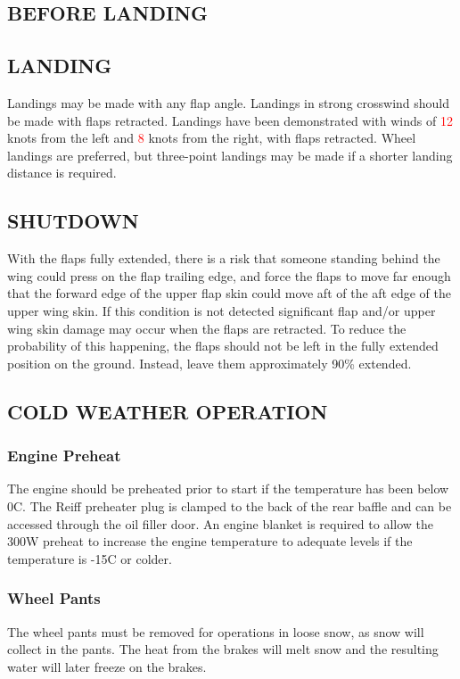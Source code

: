 \subsection{BEFORE LANDING}

\subsection{LANDING}
Landings may be made with any flap angle. Landings in strong crosswind should be made with flaps retracted. Landings have been demonstrated with winds of \textcolor{red}{12} knots from the left and \textcolor{red}{8} knots from the right, with flaps retracted. Wheel landings are preferred, but three-point landings may be made if a shorter landing distance is required.

\subsection{SHUTDOWN}
\begin{Note}[CAUTION]
With the flaps fully extended, there is a risk that someone standing behind the wing could press on the flap trailing edge, and force the flaps to move far enough that the forward edge of the upper flap skin could move aft of the aft edge of the upper wing skin. If this condition is not detected significant flap and/or upper wing skin damage may occur when the flaps are retracted. To reduce the probability of this happening, the flaps should not be left in the fully extended position on the ground. Instead, leave them approximately 90\% extended.\end{Note}

\subsection{COLD WEATHER OPERATION}
\subsubsection{Engine Preheat} The engine should be preheated prior to start if the temperature has been below 0\textdegree C.  The Reiff preheater plug is clamped to the back of the rear baffle and can be accessed through the oil filler door.  An engine blanket is required to allow the 300W preheat to increase the engine temperature to adequate levels if the temperature is -15\textdegree C or colder.

\subsubsection{Wheel Pants} The wheel pants must be removed for operations in loose snow, as snow will collect in the pants.  The heat from the brakes will melt snow and the resulting water will later freeze on the brakes.

